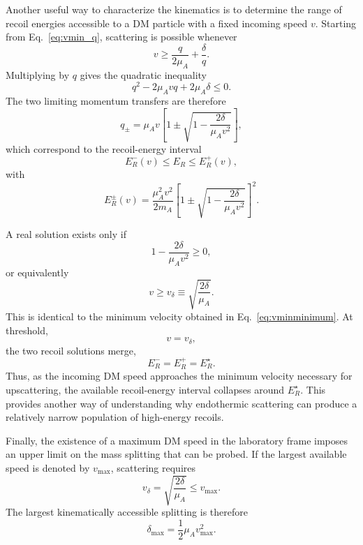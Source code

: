 \documentclass[aps,prd,reprint,superscriptaddress,nofootinbib,longbibliography,floatfix]{revtex4-2}
\begin{document}
Another useful way to characterize the kinematics is to determine the range of recoil energies accessible to a DM particle with a fixed incoming speed $v$. Starting from Eq.~\eqref{eq:vmin_q}, scattering is possible whenever
\begin{equation}
v
\geq
\frac{q}{2\mu_A}
+
\frac{\delta}{q}.
\end{equation}
Multiplying by $q$ gives the quadratic inequality
\begin{equation}
q^2
-
2\mu_Avq
+
2\mu_A\delta
\leq0.
\end{equation}
The two limiting momentum transfers are therefore
\begin{equation}
q_{\pm}
=
\mu_Av
\left[
1
\pm
\sqrt{
1-
\frac{2\delta}
{\mu_Av^2}
}
\right],
\label{eq:qpm}
\end{equation}
which correspond to the recoil-energy interval
\begin{equation}
E_R^{-}(v)
\leq
E_R
\leq
E_R^{+}(v),
\end{equation}
with
\begin{equation}
E_R^{\pm}(v)
=
\frac{\mu_A^2v^2}{2m_A}
\left[
1
\pm
\sqrt{
1-
\frac{2\delta}
{\mu_Av^2}
}
\right]^2.
\label{eq:ERpm}
\end{equation}

A real solution exists only if
\begin{equation}
1-
\frac{2\delta}
{\mu_Av^2}
\geq0,
\end{equation}
or equivalently
\begin{equation}
v
\geq
v_\delta
\equiv
\sqrt{\frac{2\delta}{\mu_A}}.
\label{eq:vthreshold}
\end{equation}
This is identical to the minimum velocity obtained in Eq.~\eqref{eq:vminminimum}. At threshold,
\begin{equation}
v=v_\delta,
\end{equation}
the two recoil solutions merge,
\begin{equation}
E_R^{-}=E_R^{+}=E_R^\star.
\end{equation}
Thus, as the incoming DM speed approaches the minimum velocity necessary for upscattering, the available recoil-energy interval collapses around $E_R^\star$. This provides another way of understanding why endothermic scattering can produce a relatively narrow population of high-energy recoils.

Finally, the existence of a maximum DM speed in the laboratory frame imposes an upper limit on the mass splitting that can be probed. If the largest available speed is denoted by $v_{\max}$, scattering requires
\begin{equation}
v_\delta
=
\sqrt{\frac{2\delta}{\mu_A}}
\leq
v_{\max}.
\end{equation}
The largest kinematically accessible splitting is therefore
\begin{equation}
\delta_{\max}
=
\frac{1}{2}
\mu_Av_{\max}^2.
\label{eq:deltamax_appendix}
\end{equation}
\end{document}
